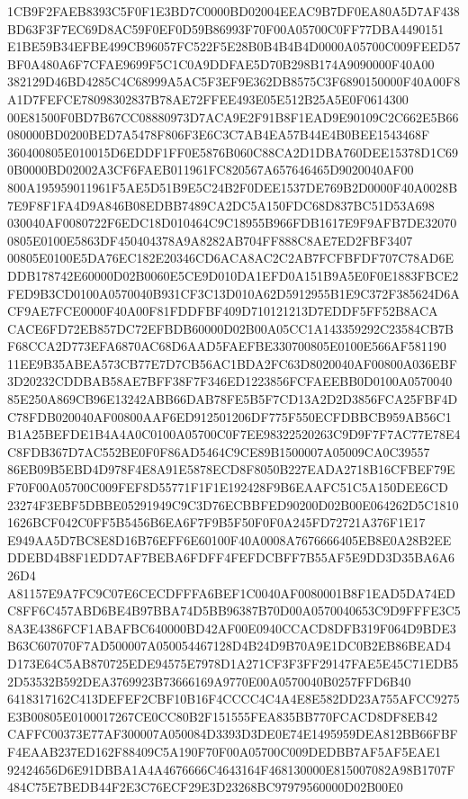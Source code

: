 \documentclass[UTF8,fontset=fandol,zihao=-4,a4paper]{ctexart}
\begin{document}
{{1CB9F2FAEB8393C5F0F1E3BD7C0000BD02004EEAC9B7DF0EA80A5D7AF438BD63F3F7EC69D8AC59F0EF0D59B86993F70F00A05700C0FF77DBA4490151
E1BE59B34EFBE499CB96057FC522F5E28B0B4B4B4D0000A05700C009FEED57BF0A480A6F7CFAE9699F5C1C0A9DDFAE5D70B298B174A9090000F40A00
382129D46BD4285C4C68999A5AC5F3EF9E362DB8575C3F6890150000F40A00F8A1D7FEFCE78098302837B78AE72FFEE493E05E512B25A5E0F0614300
00E81500F0BD7B67CC08880973D7ACA9E2F91B8F1EAD9E90109C2C662E5B66080000BD0200BED7A5478F806F3E6C3C7AB4EA57B44E4B0BEE1543468F
360400805E010015D6EDDF1FF0E5876B060C88CA2D1DBA760DEE15378D1C690B0000BD02002A3CF6FAEB011961FC820567A657646465D9020040AF00
800A195959011961F5AE5D51B9E5C24B2F0DEE1537DE769B2D0000F40A0028B7E9F8F1FA4D9A846B08EDBB7489CA2DC5A150FDC68D837BC51D53A698
030040AF0080722F6EDC18D010464C9C18955B966FDB1617E9F9AFB7DE320700805E0100E5863DF450404378A9A8282AB704FF888C8AE7ED2FBF3407
00805E0100E5DA76EC182E20346CD6ACA8AC2C2AB7FCFBFDF707C78AD6EDDB178742E60000D02B0060E5CE9D010DA1EFD0A151B9A5E0F0E1883FBCE2
FED9B3CD0100A0570040B931CF3C13D010A62D5912955B1E9C372F385624D6ACF9AE7FCE0000F40A00F81FDDFBF409D710121213D7EDDF5FF52B8ACA
CACE6FD72EB857DC72EFBDB60000D02B00A05CC1A143359292C23584CB7BF68CCA2D773EFA6870AC68D6AAD5FAEFBE330700805E0100E566AF581190
11EE9B35ABEA573CB77E7D7CB56AC1BDA2FC63D8020040AF00800A036EBF3D20232CDDBAB58AE7BFF38F7F346ED1223856FCFAEEBB0D0100A0570040
85E250A869CB96E13242ABB66DAB78FE5B5F7CD13A2D2D3856FCA25FBF4DC78FDB020040AF00800AAF6ED912501206DF775F550ECFDBBCB959AB56C1
B1A25BEFDE1B4A4A0C0100A05700C0F7EE98322520263C9D9F7F7AC77E78E4C8FDB367D7AC552BE0F0F86AD5464C9CE89B1500007A05009CA0C39557
86EB09B5EBD4D978F4E8A91E5878ECD8F8050B227EADA2718B16CFBEF79EF70F00A05700C009FEF8D55771F1F1E192428F9B6EAAFC51C5A150DEE6CD
23274F3EBF5DBBE05291949C9C3D76ECBBFED90200D02B00E064262D5C18101626BCF042C0FF5B5456B6EA6F7F9B5F50F0F0A245FD72721A376F1E17
E949AA5D7BC8E8D16B76EFF6E60100F40A0008A7676666405EB8E0A28B2EEDDEBD4B8F1EDD7AF7BEBA6FDFF4FEFDCBFF7B55AF5E9DD3D35BA6A626D4
A81157E9A7FC9C07E6CECDFFFA6BEF1C0040AF0080001B8F1EAD5DA74EDC8FF6C457ABD6BE4B97BBA74D5BB96387B70D00A0570040653C9D9FFFE3C5
8A3E4386FCF1ABAFBC640000BD42AF00E0940CCACD8DFB319F064D9BDE3B63C607070F7AD500007A050054467128D4B24D9B70A9E1DC0B2EB86BEAD4
D173E64C5AB870725EDE94575E7978D1A271CF3F3FF29147FAE5E45C71EDB52D53532B592DEA3769923B73666169A9770E00A0570040B0257FFD6B40
6418317162C413DEFEF2CBF10B16F4CCCC4C4A4E8E582DD23A755AFCC9275E3B00805E0100017267CE0CC80B2F151555FEA835BB770FCACD8DF8EB42
CAFFC00373E77AF300007A050084D3393D3DE0E74E1495959DEA812BB66FBFF4EAAB237ED162F88409C5A190F70F00A05700C009DEDBB7AF5AF5EAE1
92424656D6E91DBBA1A4A4676666C4643164F468130000E815007082A98B1707F484C75E7BEDB44F2E3C76ECF29E3D23268BC97979560000D02B00E0
}}
\end{document}
